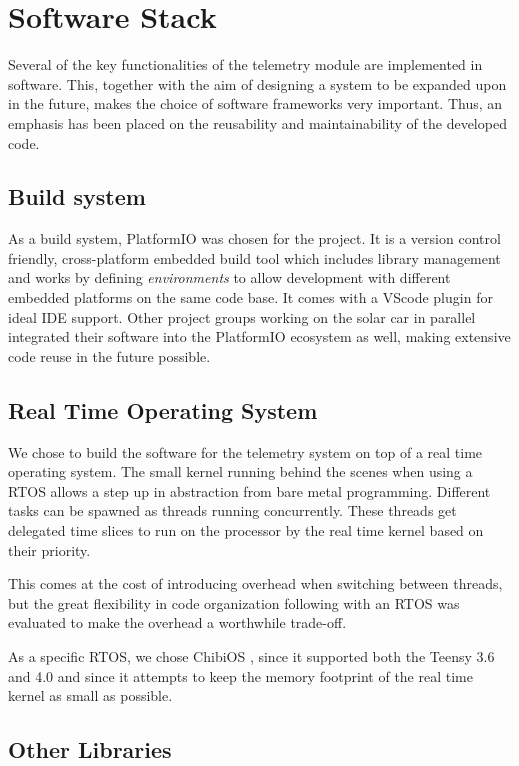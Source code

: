 \documentclass[conference]{IEEEtran}
\begin{document}
\section{Software Stack}

Several of the key functionalities of the telemetry module are implemented in software. This, together with the aim of designing a system to be expanded upon in the future, makes the choice of software frameworks very important. Thus, an emphasis has been placed on the reusability and maintainability of the developed code.

\subsection{Build system}
As a build system, PlatformIO \cite{platformIO} was chosen for the project. It is a version control friendly, cross-platform embedded build tool which includes library management and works by defining \textit{environments} to allow development with different embedded platforms on the same code base. It comes with a VScode plugin for ideal IDE support. Other project groups working on the solar car in parallel integrated their software into the PlatformIO ecosystem as well, making extensive code reuse in the future possible.

\subsection{Real Time Operating System}
We chose to build the software for the telemetry system on top of a real time operating system. The small kernel running behind the scenes when using a RTOS allows a step up in abstraction from bare metal programming. Different tasks can be spawned as threads running concurrently. These threads get delegated time slices to run on the processor by the real time kernel based on their priority. 

This comes at the cost of introducing overhead when switching between threads, but the great flexibility in code organization following with an RTOS was evaluated to make the overhead a worthwhile trade-off.

As a specific RTOS, we chose ChibiOS \cite{chibios}, since it supported both the Teensy 3.6 and 4.0 and since it attempts to keep the memory footprint of the real time kernel as small as possible.

\subsection{Other Libraries}
\end{document}
